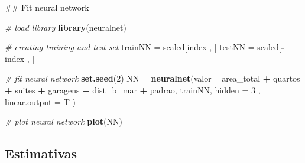 \documentclass[a4paper, 12pt]{article}
\newenvironment{Shaded}{\begin{snugshade}}{\end{snugshade}}
\newcommand{\KeywordTok}[1]{\textcolor[rgb]{0.13,0.29,0.53}{\textbf{#1}}}
\newcommand{\DataTypeTok}[1]{\textcolor[rgb]{0.13,0.29,0.53}{#1}}
\newcommand{\DecValTok}[1]{\textcolor[rgb]{0.00,0.00,0.81}{#1}}
\newcommand{\StringTok}[1]{\textcolor[rgb]{0.31,0.60,0.02}{#1}}
\newcommand{\CommentTok}[1]{\textcolor[rgb]{0.56,0.35,0.01}{\textit{#1}}}
\newcommand{\OperatorTok}[1]{\textcolor[rgb]{0.81,0.36,0.00}{\textbf{#1}}}
\newcommand{\NormalTok}[1]{#1}
\begin{document}
\begin{Shaded}
\begin{Highlighting}[]
\NormalTok{## Fit neural network }

\CommentTok{# load library}
\KeywordTok{library}\NormalTok{(neuralnet)}

\CommentTok{# creating training and test set}
\NormalTok{trainNN =}\StringTok{ }\NormalTok{scaled[index , ]}
\NormalTok{testNN =}\StringTok{ }\NormalTok{scaled[}\OperatorTok{-}\NormalTok{index , ]}

\CommentTok{# fit neural network}
\KeywordTok{set.seed}\NormalTok{(}\DecValTok{2}\NormalTok{)}
\NormalTok{NN =}\StringTok{ }\KeywordTok{neuralnet}\NormalTok{(valor }\OperatorTok{~}\StringTok{ }\NormalTok{area_total }\OperatorTok{+}\StringTok{ }\NormalTok{quartos }\OperatorTok{+}\StringTok{ }\NormalTok{suites }\OperatorTok{+}\StringTok{ }\NormalTok{garagens }\OperatorTok{+}\StringTok{ }\NormalTok{dist_b_mar }\OperatorTok{+}\StringTok{ }\NormalTok{padrao, trainNN, }
               \DataTypeTok{hidden =} \DecValTok{3}\NormalTok{ , }\DataTypeTok{linear.output =}\NormalTok{ T )}

\CommentTok{# plot neural network}
\KeywordTok{plot}\NormalTok{(NN)}
\end{Highlighting}
\end{Shaded}

\subsection{Estimativas}\label{estimativas}

\begin{Shaded}
\end{Shaded}
\end{document}
